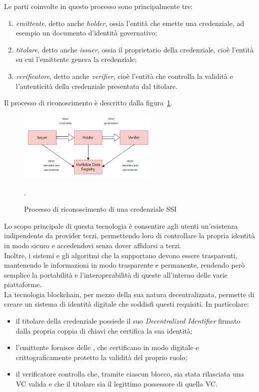 \clearpage

Le parti coinvolte in questo processo sono principalmente tre:
\begin{enumerate}
    \item {\textit{emittente}, detto anche \textit{holder}}, ossia l'entità che emette una credenziale, ad esempio un documento d'identità governativo;
    \item {\textit{titolare}, detto anche \textit{issuer}}, ossia il proprietario della credenziale, cioè l'entità su cui l'emittente genera la credenziale;
    \item {\textit{verificatore}, detto anche \textit{verifier}}, cioè l'entità che controlla la validità e l'autenticità della credenziale presentata dal titolare.
\end{enumerate}  

Il processo di riconoscimento è descritto dalla figura~\ref{fig:ssi}.

\begin{figure}[ht]
    \centering
    \includegraphics[width=0.6\textwidth, alt={Come funziona il riconoscimento nella SSI}]{immagini/ssi.png}
    \caption{Processo di riconoscimento di una credenziale SSI}\label{fig:ssi}.
\end{figure}


Lo scopo principale di questa tecnologia è consentire agli utenti un'esistenza indipendente da provider terzi, 
permettendo loro di controllare la propria identità in modo sicuro e accedendovi senza dover affidarsi a terzi. \\
Inoltre, i sistemi e gli algoritmi che la supportano devono essere trasparenti, mantenendo le informazioni in modo trasparente e permanente, rendendo però semplice 
la portabilità e l'interoperabilità di queste all'interno delle varie piattaforme. \\

La tecnologia blockchain, per mezzo della sua natura decentralizzata, permette di creare un sistema di identità digitale che soddisfi questi requisiti.
In particolare:
\begin{itemize}
    \item il titolare della credenziale possiede il suo \textit{Decentralized Identifier} firmato dalla propria coppia di chiavi che certifica la sua identità;
    \item l'emittente fornisce delle , che certificano in modo digitale e crittograficamente protetto la validità del proprio ruolo;
    \item il verificatore controlla che, tramite ciascun blocco, sia stata rilasciata una VC valida e che il titolare sia il legittimo possessore di quella VC.\@
\end{itemize}  

